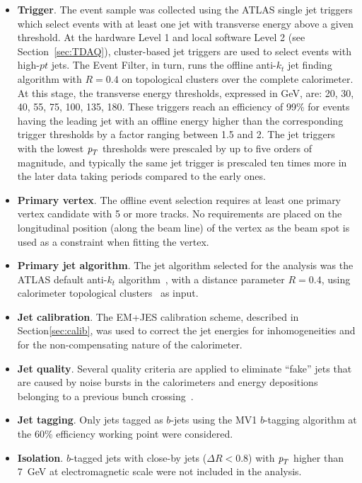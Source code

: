 \begin{itemize}
\item
\textbf{Trigger}. The event sample was collected  using the ATLAS single jet triggers which select events with at least one jet with transverse energy above a given threshold.  At the hardware Level 1 and local software Level 2 (see Section~\ref{sec:TDAQ}), cluster-based jet triggers are used to select events with high-$pt$ jets. The Event Filter, in turn, runs  the offline anti-$k_t$ jet finding algorithm with $R = 0.4$ on topological clusters over the complete calorimeter.  At this stage, the transverse energy thresholds, expressed in GeV, are: 20, 30, 40, 55, 75, 100, 135, 180. These triggers reach an efficiency of 99\% for events having the leading jet with an offline energy higher than the corresponding trigger thresholds by a factor ranging between 1.5 and 2. The jet triggers with the lowest ${\emph{p}_{T}}$ thresholds were prescaled by up to five orders of magnitude, and typically the same jet trigger is prescaled ten times more in the later data taking periods compared to the early ones. 
\item
\textbf{Primary vertex}.  The offline event selection requires at least one primary vertex candidate with 5 or more tracks.  No requirements are placed on the longitudinal position (along the beam line) of the vertex as the beam spot is used as a constraint when fitting the vertex. 
\item
\textbf{Primary jet algorithm}. The jet algorithm selected for the analysis was the ATLAS default anti-$k_t$ algorithm~\cite{antiktalg}, with a distance parameter $R = 0.4$, using calorimeter topological clusters~\cite{topoClusters} as input.
\item
\textbf{Jet calibration}.  The EM+JES calibration scheme, described in Section\ref{sec:calib}, was used to correct the jet energies for inhomogeneities and for the non-compensating nature of the calorimeter.
\item
\textbf{Jet quality}.  Several quality criteria are applied to eliminate ``fake'' jets that are caused by noise bursts in the calorimeters and energy depositions belonging to a previous bunch crossing~\cite{ATLAS-CONF-2012-020}.
\item
\textbf{Jet tagging}.  Only jets tagged as $b$-jets using the MV1 $b$-tagging algorithm at the 60\% efficiency working point were considered.
\item
\textbf{Isolation}.  $b$-tagged jets with close-by jets ($\Delta R < 0.8$) with ${\emph{p}_{T}}$ higher than 7~GeV at electromagnetic scale were not included in the analysis.
\end{itemize}

